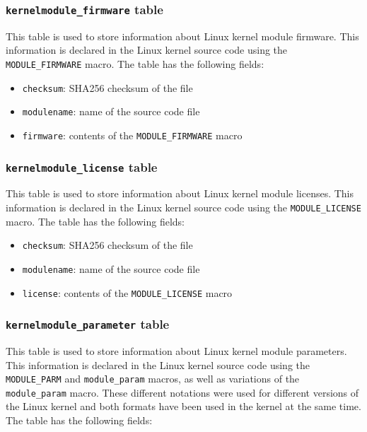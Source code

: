 \documentclass[10pt,a4paper]{article}
\begin{document}
\subsubsection{\texttt{kernelmodule\_firmware} table}

This table is used to store information about Linux kernel module firmware.
This information is declared in the Linux kernel source code using the
\texttt{MODULE\_FIRMWARE} macro. The table has the following fields:

\begin{itemize}
\item \texttt{checksum}: SHA256 checksum of the file
\item \texttt{modulename}: name of the source code file
\item \texttt{firmware}: contents of the \texttt{MODULE\_FIRMWARE} macro
\end{itemize}

\subsubsection{\texttt{kernelmodule\_license} table}

This table is used to store information about Linux kernel module licenses.
This information is declared in the Linux kernel source code using the
\texttt{MODULE\_LICENSE} macro. The table has the following fields:

\begin{itemize}
\item \texttt{checksum}: SHA256 checksum of the file
\item \texttt{modulename}: name of the source code file
\item \texttt{license}: contents of the \texttt{MODULE\_LICENSE} macro
\end{itemize}

\subsubsection{\texttt{kernelmodule\_parameter} table}

This table is used to store information about Linux kernel module parameters.
This information is declared in the Linux kernel source code using the
\texttt{MODULE\_PARM} and \texttt{module\_param} macros, as well as variations
of the \texttt{module\_param} macro. These different notations were used for
different versions of the Linux kernel and both formats have been used in the
kernel at the same time. The table has the following fields:
\end{document}
